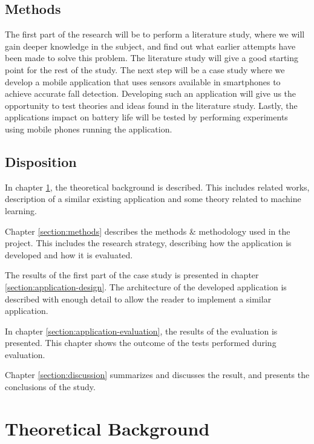 \documentclass[12pt, a4paper, onecolumn]{article}
\begin{document}
		\subsection{Methods}
		
		The first part of the research will be to perform a literature study, where we will gain deeper knowledge in the subject, and find out what earlier attempts have been made to solve this problem. The literature study will give a good starting point for the rest of the study. The next step will be a case study where we develop a mobile application that uses sensors available in smartphones to achieve accurate fall detection. Developing such an application will give us the opportunity to test theories and ideas found in the literature study. Lastly, the applications impact on battery life will be tested by performing experiments using mobile phones running the application.
		
		\subsection{Disposition}
		
		In chapter \ref{section:theoretical-background}, the theoretical background is described. This includes related works, description of a similar existing application and some theory related to machine learning.
		
		Chapter \ref{section:methods} describes the methods \& methodology used in the project. This includes the research strategy, describing how the application is developed and how it is evaluated.
		
		The results of the first part of the case study is presented in chapter \ref{section:application-design}. The architecture of the developed application is described with enough detail to allow the reader to implement a similar application.
		
		In chapter \ref{section:application-evaluation}, the results of the evaluation is presented. This chapter shows the outcome of the tests performed during evaluation.
		
		Chapter \ref{section:discussion} summarizes and discusses the result, and presents the conclusions of the study.
	\newpage
	
	\section{Theoretical Background} \label{section:theoretical-background}
	
\end{document}
